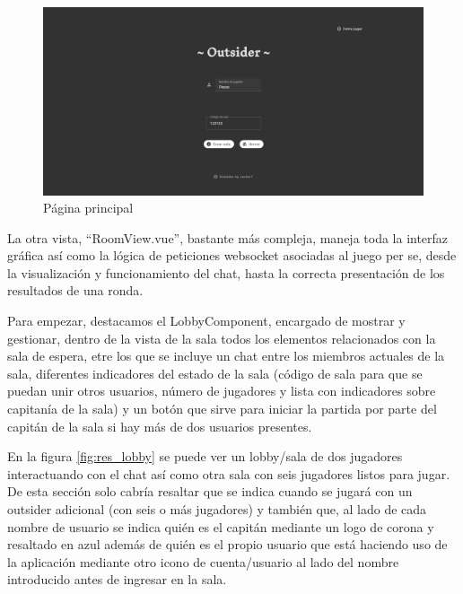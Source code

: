 \begin{figure}[h]
	\centering
	\includegraphics[width=\textwidth,clip=true]{res_mainpage.png}
	\caption{Página principal}
	\label{fig:res_mainpage}
\end{figure}

La otra vista, ``RoomView.vue'', bastante más compleja, maneja toda la interfaz gráfica así como la lógica de peticiones websocket asociadas al juego per se, desde la
visualización y funcionamiento del chat, hasta la correcta presentación de los resultados de una ronda.

Para empezar, destacamos el LobbyComponent, encargado de mostrar y gestionar, dentro de la vista de la sala todos los elementos relacionados con la sala de espera, etre los que se
incluye un chat entre los miembros actuales de la sala, diferentes indicadores del estado de la sala (código de sala para que se puedan unir otros usuarios, número de jugadores y
lista con indicadores sobre capitanía de la sala) y un botón que sirve para iniciar la partida por parte del capitán de la sala si hay más de dos usuarios presentes.

En la figura \ref{fig:res_lobby} se puede ver un lobby/sala de dos jugadores interactuando con el chat así como otra sala con seis jugadores listos para jugar. De esta sección solo
cabría resaltar que se indica cuando se jugará con un outsider adicional (con seis o más jugadores) y también que, al lado de cada nombre de usuario se indica quién es el capitán mediante
un logo de corona y resaltado en azul además de quién es el propio usuario que está haciendo uso de la aplicación mediante otro icono de cuenta/usuario al lado del nombre introducido
antes de ingresar en la sala.

